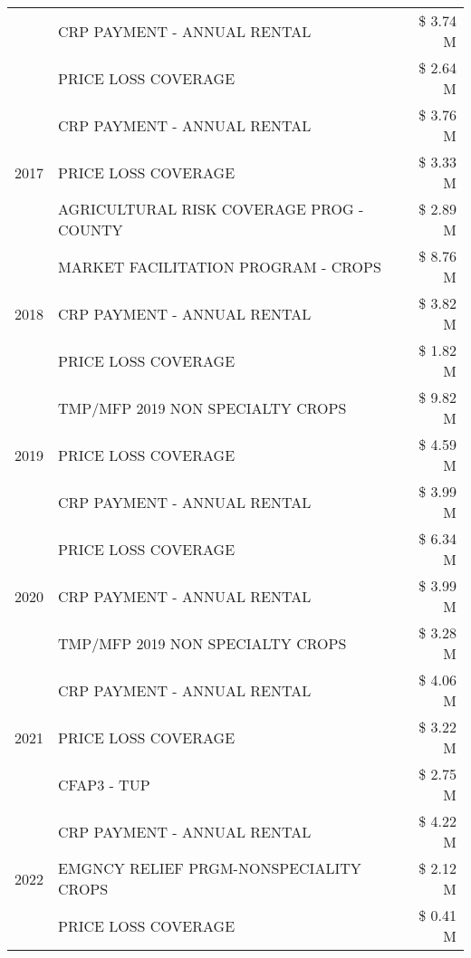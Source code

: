 \begin{tabular}{llr}
 & CRP PAYMENT - ANNUAL RENTAL & \$ 3.74 M \\
 & PRICE LOSS COVERAGE & \$ 2.64 M \\
\cline{1-3}
\multirow[t]{3}{*}{2017} & CRP PAYMENT - ANNUAL RENTAL & \$ 3.76 M \\
 & PRICE LOSS COVERAGE & \$ 3.33 M \\
 & AGRICULTURAL RISK COVERAGE PROG - COUNTY & \$ 2.89 M \\
\cline{1-3}
\multirow[t]{3}{*}{2018} & MARKET FACILITATION PROGRAM - CROPS & \$ 8.76 M \\
 & CRP PAYMENT - ANNUAL RENTAL & \$ 3.82 M \\
 & PRICE LOSS COVERAGE & \$ 1.82 M \\
\cline{1-3}
\multirow[t]{3}{*}{2019} & TMP/MFP 2019 NON SPECIALTY CROPS & \$ 9.82 M \\
 & PRICE LOSS COVERAGE & \$ 4.59 M \\
 & CRP PAYMENT - ANNUAL RENTAL & \$ 3.99 M \\
\cline{1-3}
\multirow[t]{3}{*}{2020} & PRICE LOSS COVERAGE & \$ 6.34 M \\
 & CRP PAYMENT - ANNUAL RENTAL & \$ 3.99 M \\
 & TMP/MFP 2019 NON SPECIALTY CROPS & \$ 3.28 M \\
\cline{1-3}
\multirow[t]{3}{*}{2021} & CRP PAYMENT - ANNUAL RENTAL & \$ 4.06 M \\
 & PRICE LOSS COVERAGE & \$ 3.22 M \\
 & CFAP3 - TUP & \$ 2.75 M \\
\cline{1-3}
\multirow[t]{3}{*}{2022} & CRP PAYMENT - ANNUAL RENTAL & \$ 4.22 M \\
 & EMGNCY RELIEF PRGM-NONSPECIALITY CROPS & \$ 2.12 M \\
 & PRICE LOSS COVERAGE & \$ 0.41 M \\
\cline{1-3}
\bottomrule
\end{tabular}
